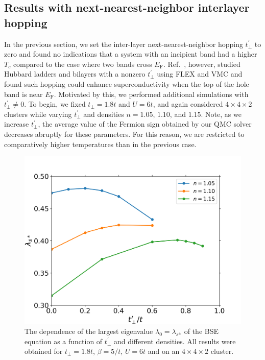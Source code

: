 \documentclass[prb,twocolumn,amsmath,amssymb,superscriptaddress,floatfix,nofootinbib]{revtex4-2}
\begin{document}
\subsection{Results with next-nearest-neighbor interlayer hopping}
In the previous section, we set the inter-layer next-nearest-neighbor hopping $t_\perp^{\prime}$ to zero and found 
no indications that a system with an incipient band had a higher $T_c$ compared to the case where two bands cross $E_\mathrm{F}$. 
Ref.~\cite{KurokiFlex2020}, however, studied Hubbard ladders and bilayers with a nonzero $t_\perp^{\prime}$ using FLEX and VMC and found such hopping could enhance superconductivity when the top of the hole band is near $E_\mathrm{F}$. Motivated by this, we performed additional simulations with  $t_\perp^{\prime} \ne 0$. To begin, we fixed $t_\perp =1.8t$ and $U=6t$, and again considered $4\times 4\times 2$ clusters while varying $t_\perp^{\prime}$ and densities $n=1.05$, $1.10$, and $1.15$. Note, as we increase $t_\perp^{\prime}$, the average value of the Fermion sign obtained by our QMC solver decreases abruptly for these parameters. For this reason, we are restricted to comparatively higher temperatures than in the previous case. 

\begin{figure}[t]
\centering
\includegraphics[scale=0.4]{U6_tperp1pt8_varydensity.png}
\caption{The dependence of the largest eigenvalue $\lambda_0 = \lambda_{s^\pm}$ of the BSE equation as a function of $t_{\perp}^{\prime}$ and  different densities. All results were obtained for $t_{\perp}=1.8t$, $\beta=5/t$, $U=6t$ and on an $4\times 4\times 2$ cluster.}
\label{fig:lambdatperpprime}
\end{figure}
\end{document}
